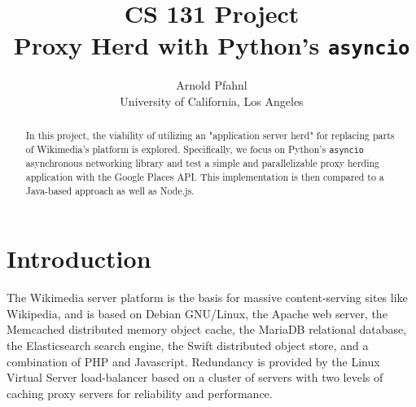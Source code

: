 

\date{}

\title{\Large \bf CS 131 Project \\ Proxy Herd with Python's \texttt{asyncio}}

\author{
{\rm Arnold Pfahnl}\\
University of California, Los Angeles
} %

\maketitle

\begin{abstract}
In this project, the viability of utilizing an "application server herd" for replacing parts of Wikimedia's platform is explored. Specifically, we focus on Python's \texttt{asyncio} asynchronous networking library and test a simple and parallelizable proxy herding application with the Google Places API. This implementation is then compared to a Java-based approach as well as Node.js.
\end{abstract}


\section{Introduction}

The Wikimedia server platform is the basis for massive content-serving sites like Wikipedia, and is based on Debian GNU/Linux, the Apache web server, the Memcached distributed memory object cache, the MariaDB relational database, the Elasticsearch search engine, the Swift distributed object store, and a combination of PHP and Javascript. Redundancy is provided by the Linux Virtual Server load-balancer based on a cluster of servers with two levels of caching proxy servers for reliability and performance.

